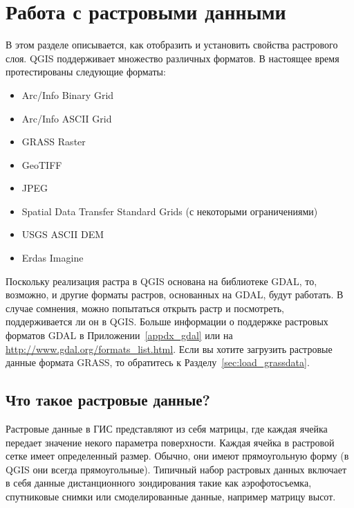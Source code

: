 
\chapter{Работа с растровыми данными}\label{label_raster}


В этом разделе описывается, как отобразить и установить свойства
растрового слоя. QGIS поддерживает множество различных форматов.
В настоящее время протестированы следующие форматы:

\begin{itemize}[label=--]
\item Arc/Info Binary Grid
\item Arc/Info ASCII Grid
\item GRASS Raster
\item GeoTIFF
\item JPEG
\item Spatial Data Transfer Standard Grids (с некоторыми ограничениями)
\item USGS ASCII DEM
\item Erdas Imagine
\end{itemize}

Поскольку реализация растра в QGIS основана на библиотеке GDAL, то,
возможно, и другие форматы растров, основанных на GDAL, будут работать.
В случае сомнения, можно попытаться открыть растр и посмотреть,
поддерживается ли он в QGIS. Больше информации о поддержке растровых
форматов GDAL в Приложении~\ref{appdx_gdal}
или на  \url{http://www.gdal.org/formats_list.html}. Если вы хотите
загрузить растровые данные формата GRASS, то обратитесь к
Разделу~\ref{sec:load_grassdata}.

\section{Что такое растровые данные?}\label{label_whatsraster}

Растровые данные в ГИС представляют из себя матрицы, где каждая ячейка
передает значение некого параметра поверхности. Каждая ячейка в
растровой сетке имеет определенный размер. Обычно, они имеют
прямоугольную форму (в QGIS они всегда прямоугольные).  Типичный набор
растровых данных включает в себя данные дистанционного зондирования
такие как аэрофотосъемка, спутниковые снимки или смоделированные данные,
например матрицу высот.

